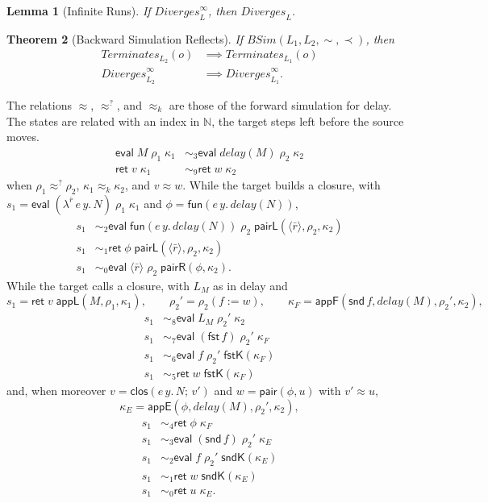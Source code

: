 \documentclass[10pt]{article}
\theoremstyle{acmplain}
\newtheorem{theorem}{Theorem}[section]
\newtheorem{lemma}[theorem]{Lemma}
\newcommand{\key}[1]{\mathsf{#1}}
\newcommand{\pass}[1]{\mathit{#1}}
\newcommand{\clos}[2]{\lambda^{#1}\, #2.\,}
\newcommand{\tuple}[1]{\langle #1 \rangle}
\newcommand{\fun}[1]{\key{fun}(#1)}
\newcommand{\FST}{\key{fst}\,}
\newcommand{\SND}{\key{snd}\,}
\newcommand{\ext}[3]{#1(#2{:=}#3)}
\newcommand{\ev}[3]{\key{eval}\;#1\;#2\;#3}
\newcommand{\rt}[2]{\key{ret}\;#1\;#2}
\newcommand{\Term}{\mathit{Terminates}}
\newcommand{\Div}{\mathit{Diverges}}
\newcommand{\BSim}{\mathit{BSim}}
\newcommand{\closV}[2]{\key{clos}(#1;\, #2)}
\newcommand{\pairV}[2]{\key{pair}(#1, #2)}
\newcommand{\funV}[1]{\key{fun}(#1)}
\newcommand{\Kf}[2]{\key{#1}(#2)}
\newcommand{\approxk}{\approx_k}
\newcommand{\approxq}{\approx^{?}}
\begin{document}
\begin{lemma}[Infinite Runs]\label{lem:div-inf}
If $\Div^\infty_L$, then $\Div_L$.
\end{lemma}

\begin{theorem}[Backward Simulation Reflects]\label{thm:bsim}
If $\BSim(L_1, L_2, \sim, \prec)$, then
\begin{align*}
  \Term_{L_2}(o) &\implies \Term_{L_1}(o) \\
  \Div^\infty_{L_2} &\implies \Div^\infty_{L_1} .
\end{align*}
\end{theorem}

The relations $\approx$, $\approxq$, and $\approxk$ are those of the forward
simulation for delay. The states are related with an index in $\mathbb{N}$,
the target steps left before the source moves.
\begin{align*}
  \ev{M}{\rho_1}{\kappa_1} &\sim_3 \ev{\pass{delay}(M)}{\rho_2}{\kappa_2} \\
  \rt{v}{\kappa_1} &\sim_9 \rt{w}{\kappa_2}
\end{align*}
when $\rho_1 \approxq \rho_2$, $\kappa_1 \approxk \kappa_2$, and $v \approx w$.
While the target builds a closure, with
$s_1 = \ev{(\clos{\bar{r}}{e\, y} N)}{\rho_1}{\kappa_1}$
and $\phi = \funV{e\, y.\, \pass{delay}(N)}$,
\begin{align*}
  s_1 &\sim_2 \ev{\fun{e\,y.\,\pass{delay}(N)}}{\rho_2}{\Kf{pairL}{\tuple{\bar{r}}, \rho_2, \kappa_2}} \\
  s_1 &\sim_1 \rt{\phi}{\Kf{pairL}{\tuple{\bar{r}}, \rho_2, \kappa_2}} \\
  s_1 &\sim_0 \ev{\tuple{\bar{r}}}{\rho_2}{\Kf{pairR}{\phi, \kappa_2}} .
\end{align*}
While the target calls a closure, with $L_M$ as in delay and
\[
  s_1 = \rt{v}{\Kf{appL}{M, \rho_1, \kappa_1}}, \qquad
  \rho_2' = \ext{\rho_2}{f}{w}, \qquad
  \kappa_F = \Kf{appF}{\SND f, \pass{delay}(M), \rho_2', \kappa_2},
\]
\begin{align*}
  s_1 &\sim_8 \ev{L_M}{\rho_2'}{\kappa_2} \\
  s_1 &\sim_7 \ev{(\FST f)}{\rho_2'}{\kappa_F} \\
  s_1 &\sim_6 \ev{f}{\rho_2'}{\Kf{fstK}{\kappa_F}} \\
  s_1 &\sim_5 \rt{w}{\Kf{fstK}{\kappa_F}}
\end{align*}
and, when moreover $v = \closV{e\, y.\, N}{v'}$ and $w = \pairV{\phi}{u}$ with $v' \approx u$,
\[
  \kappa_E = \Kf{appE}{\phi, \pass{delay}(M), \rho_2', \kappa_2},
\]
\begin{align*}
  s_1 &\sim_4 \rt{\phi}{\kappa_F} \\
  s_1 &\sim_3 \ev{(\SND f)}{\rho_2'}{\kappa_E} \\
  s_1 &\sim_2 \ev{f}{\rho_2'}{\Kf{sndK}{\kappa_E}} \\
  s_1 &\sim_1 \rt{w}{\Kf{sndK}{\kappa_E}} \\
  s_1 &\sim_0 \rt{u}{\kappa_E} .
\end{align*}
\end{document}
